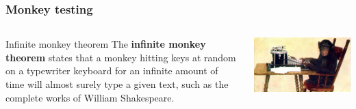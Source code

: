 \documentclass{beamer}
\begin{document}
\begin{frame}
\frametitle{Monkey testing}
    \begin{columns}[c] %
\begin{block}{Infinite monkey theorem}
The \textbf{infinite monkey theorem} states that a monkey hitting keys at random
on a typewriter keyboard for an infinite amount of time will almost surely type a
given text, such as the complete works of William Shakespeare.\cite{monkey}
\end{block}
    \includegraphics[width=\textwidth]{../img/monkey_approach} 
    \end{columns}
\end{frame}
\end{document}
